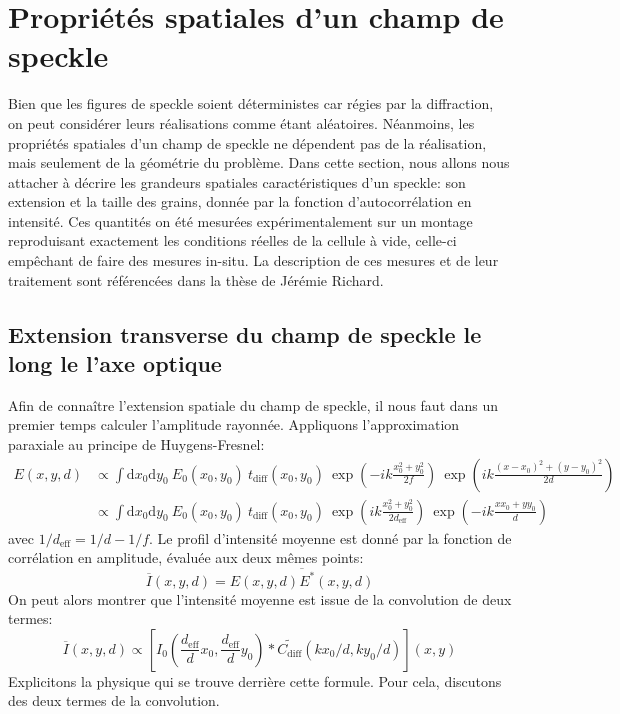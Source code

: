 \section{Propriétés spatiales d'un champ de speckle}
Bien que les figures de speckle soient déterministes car régies par la diffraction, on peut considérer leurs réalisations comme étant aléatoires. Néanmoins, les propriétés spatiales d'un champ de speckle ne dépendent pas de la réalisation, mais seulement de la géométrie du problème. Dans cette section, nous allons nous attacher à décrire les grandeurs spatiales caractéristiques d'un speckle: son extension et la taille des grains, donnée par la fonction d'autocorrélation en intensité. Ces quantités on été mesurées expérimentalement sur un montage reproduisant exactement les conditions réelles de la cellule à vide, celle-ci empêchant de faire des mesures in-situ. La description de ces mesures et de leur traitement sont référencées dans la thèse de Jérémie Richard.

\subsection{Extension transverse du champ de speckle le long le l'axe optique}
Afin de connaître l'extension spatiale du champ de speckle, il nous faut dans un premier temps calculer l'amplitude rayonnée. Appliquons l'approximation paraxiale au principe de Huygens-Fresnel:
\begin{align}
E(x,y,d)&\propto \int{\mathrm{d}x_0 \mathrm{d}y_0 \: E_0(x_0,y_0) \: t_{\mathrm{diff}}(x_0,y_0) \: \exp{\left( -ik\frac{x_0^2+y_0^2}{2f} \right) } \: \exp{ \left( ik\frac{(x-x_0)^2+(y-y_0)^2}{2d} \right) }} \\
&\propto \int{\mathrm{d}x_0 \mathrm{d}y_0 \: E_0(x_0,y_0) \: t_{\mathrm{diff}}(x_0,y_0) \: \exp{\left( ik\frac{x_0^2+y_0^2}{2d_{\mathrm{eff}}} \right) } \: \exp{\left( -ik \frac{xx_0+yy_0}{d} \right) }}
\end{align}
avec $1/d_{\mathrm{eff}}=1/d-1/f$. Le profil d'intensité moyenne est donné par la fonction de corrélation en amplitude, évaluée aux deux mêmes points:
\begin{equation}
\overline{I}(x,y,d)=\overline{E(x,y,d)E^*(x,y,d)}
\end{equation}
On peut alors montrer que l'intensité moyenne est issue de la convolution de deux termes:
\begin{equation}
\overline{I}(x,y,d)\propto \left[ I_0(\frac{d_{\mathrm{eff}}}{d}x_0,\frac{d_{\mathrm{eff}}}{d}y_0) \ast \widetilde{C_{\mathrm{diff}}}(kx_0/d,ky_0/d) \right] (x,y)
\end{equation}
Explicitons la physique qui se trouve derrière cette formule. Pour cela, discutons des deux termes de la convolution. 

